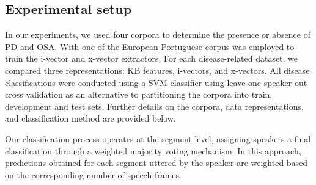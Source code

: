 \subsection{Experimental setup}
In our experiments, we used four corpora to determine the presence or absence of \ac{PD} and \ac{OSA}. With one of the  European Portuguese corpus was employed to train the i-vector and x-vector extractors. For each disease-related dataset, we compared three representations: \ac{KB} features, i-vectors, and x-vectors. All disease classifications were conducted using a \ac{SVM} classifier using leave-one-speaker-out cross validation
as an alternative to partitioning the corpora into train, development and test sets. Further details on the corpora, data representations, and classification method are provided below.

Our classification process operates at the segment level, assigning speakers a final classification through a weighted majority voting mechanism. In this approach, predictions obtained for each segment uttered by the speaker are weighted based on the corresponding number of speech frames.
